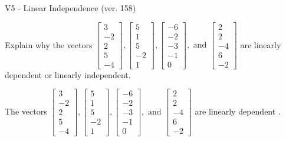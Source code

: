 \begin{exercise}
  \begin{exerciseTitle}V5 - Linear Independence (ver. 158)\end{exerciseTitle}
  \begin{exerciseStatement}
    Explain why the vectors \(\left[\begin{array}{r}
3 \\
-2 \\
2 \\
5 \\
-4
\end{array}\right] , \left[\begin{array}{r}
5 \\
1 \\
5 \\
-2 \\
1
\end{array}\right] , \left[\begin{array}{r}
-6 \\
-2 \\
-3 \\
-1 \\
0
\end{array}\right] , \text{ and } \left[\begin{array}{r}
2 \\
2 \\
-4 \\
6 \\
-2
\end{array}\right]\) are linearly dependent or linearly independent.	


  \end{exerciseStatement}
  \begin{exerciseAnswer}
   The vectors \(\left[\begin{array}{r}
3 \\
-2 \\
2 \\
5 \\
-4
\end{array}\right] , \left[\begin{array}{r}
5 \\
1 \\
5 \\
-2 \\
1
\end{array}\right] , \left[\begin{array}{r}
-6 \\
-2 \\
-3 \\
-1 \\
0
\end{array}\right] , \text{ and } \left[\begin{array}{r}
2 \\
2 \\
-4 \\
6 \\
-2
\end{array}\right]\) are 
  	 linearly dependent  .
  


  \end{exerciseAnswer}
\end{exercise}